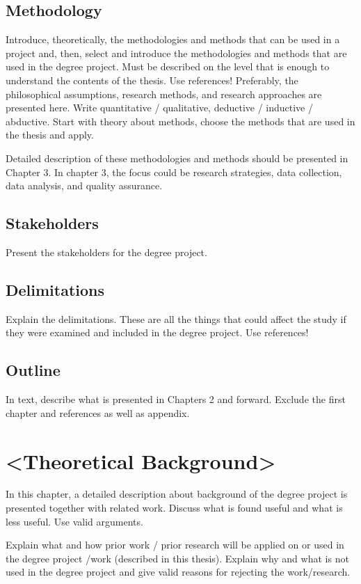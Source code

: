 \subsection{Methodology}
Introduce, theoretically, the methodologies and methods that can be used in a project and, then, select and introduce the methodologies and methods that are used in the degree project. Must be described on the level that is enough to understand the contents of the thesis. 
Use references!
Preferably, the philosophical assumptions, research methods, and research approaches are presented here. Write quantitative / qualitative, deductive / inductive / abductive. Start with theory about methods, choose the methods that are used in the thesis and apply. 


Detailed description of these methodologies and methods should be presented in Chapter 3. In chapter 3, the focus could be research strategies, data collection, data analysis, and quality assurance.


\subsection{Stakeholders}
Present the stakeholders for the degree project.

\subsection{Delimitations}
Explain the delimitations. These are all the things that could affect the study if they were examined and included in the degree project. 
Use references!

\subsection{Outline}
In text, describe what is presented in Chapters 2 and forward. Exclude the first chapter and references as well as appendix. 


\newpage   


\section{<Theoretical Background>}
In this chapter, a detailed description about background of the degree project is presented together with related work. Discuss what is found useful and what is less useful. Use valid arguments. 

Explain what and how prior work / prior research will be applied on or used in the degree project /work (described in this thesis). Explain why and what is not used in the degree project and give valid reasons for rejecting the work/research.

